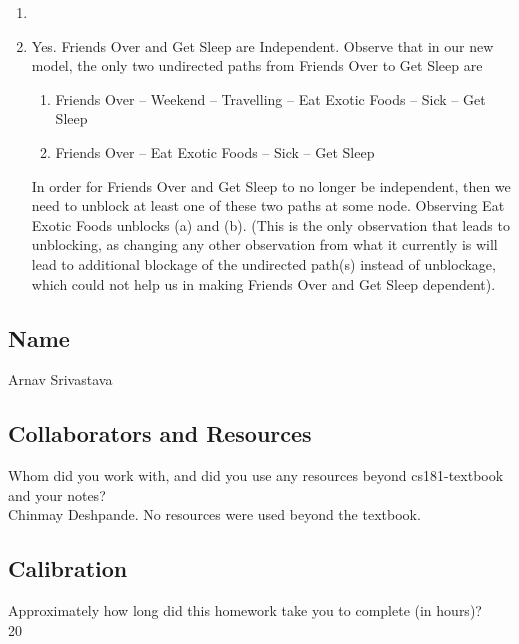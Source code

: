 \documentclass[submit]{harvardml}
\newcommand{\attr}[1]{\textsf{#1}}
\begin{document}
\begin{enumerate}
  
  \item  \\
  \begin{center}
    \end{center}
  \item Yes. Friends Over and Get Sleep are Independent. Observe that in our new model, the only two undirected paths from Friends Over to Get Sleep are 
  \begin{enumerate}
      \item Friends Over -- Weekend -- Travelling -- Eat Exotic Foods -- Sick -- Get Sleep   
      \item Friends Over -- Eat Exotic Foods -- Sick -- Get Sleep
  \end{enumerate}
  In order for Friends Over and Get Sleep to no longer be independent, then we need to unblock at least one of these two paths at some node. Observing Eat Exotic Foods unblocks (a) and (b). (This is the only observation that leads to unblocking, as changing any other observation from what it currently is will lead to additional blockage of the undirected path(s) instead of unblockage, which could not help us in making Friends Over and Get Sleep dependent).
  
\end{enumerate}

\newpage
\subsection*{Name}
Arnav Srivastava
\subsection*{Collaborators and Resources}
Whom did you work with, and did you use any resources beyond cs181-textbook and your notes? \\
Chinmay Deshpande. No resources were used beyond the textbook.

\subsection*{Calibration}
Approximately how long did this homework take you to complete (in hours)? \\
20
\end{document}
